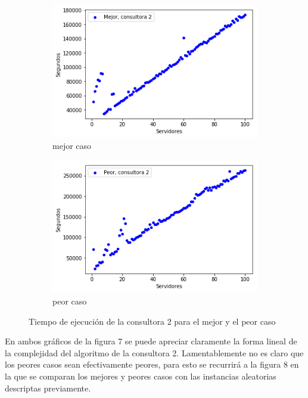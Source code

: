 \documentclass[A4paper,oneside,fleqn,11pt]{article}
\theoremstyle{definition}
\begin{document}
\begin{figure}[H] %
    \begin{subfigure}[b]{0.45\textwidth}
        \includegraphics[width=\textwidth]{graficosEj2/m2}
        \caption[center]{mejor caso}
        \label{ni se pa que sirve esto}
    \end{subfigure}
    \begin{subfigure}[b]{0.45\textwidth}
        \includegraphics[width=\textwidth]{graficosEj2/p2}
        \caption{peor caso}
        \label{ni se pa que sirve esto}
    \end{subfigure}
    \caption{Tiempo de ejecución de la consultora 2 para el mejor y el peor caso}
\end{figure}

En ambos gráficos de la figura 7 se puede apreciar claramente la forma lineal de la complejidad del algoritmo de la consultora 2. Lamentablemente no es claro que los peores casos sean efectivamente peores, para esto se recurrirá a la figura 8 en la que se comparan los mejores y peores casos con las instancias aleatorias descriptas previamente.
\end{document}
